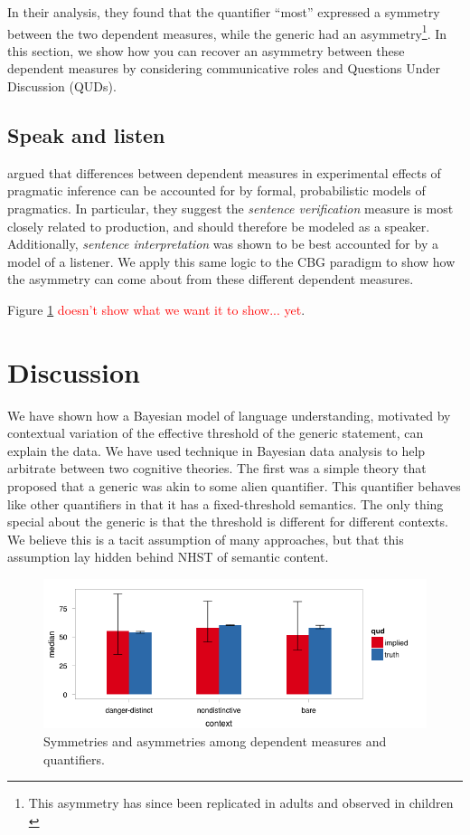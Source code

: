 \documentclass[10pt,letterpaper]{article}
\newcommand{\red}[1]{\textcolor{Red}{#1}}
\begin{document}
In their analysis, they found that the quantifier ``most'' expressed a symmetry between the two dependent measures, while the generic had an asymmetry\footnote{This asymmetry has since been replicated in adults and observed in children \cite{Brandone2014}}. In this section, we show how you can recover an asymmetry between these dependent measures by considering communicative roles and Questions Under Discussion (QUDs).

\subsection{Speak and listen}

 argued that differences between dependent measures in experimental effects of pragmatic inference can be accounted for by formal, probabilistic models of pragmatics. In particular, they suggest the \emph{sentence verification} measure is most closely related to production, and should therefore be modeled as a speaker. Additionally, \emph{sentence interpretation} was shown to be best accounted for by a model of a listener. We apply this same logic to the CBG paradigm to show how the asymmetry can come about from these different dependent measures.

Figure \ref{fig:asymmetry} \red{doesn't show what we want it to show... yet}.



\section{Discussion}

We have shown how a Bayesian model of language understanding, motivated by contextual variation of the effective threshold of the generic statement, can explain the data. We have used technique in Bayesian data analysis to help arbitrate between two cognitive theories. The first was a simple theory that proposed that a generic was akin to some alien quantifier. This quantifier behaves like other quantifiers in that it has a fixed-threshold semantics. The only thing special about the generic is that the threshold is different for different contexts. We believe this is a tacit assumption of many approaches, but that this assumption lay hidden behind NHST of semantic content.

\begin{figure}
\centering
    \includegraphics[width=\columnwidth]{exp9_postpred_speakListen_asymmetry}
    \caption{Symmetries and asymmetries among dependent measures and quantifiers.}
  \label{fig:asymmetry}
\end{figure}
\end{document}
